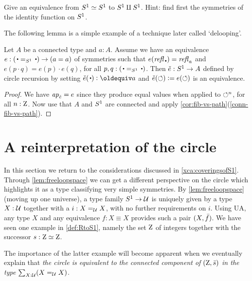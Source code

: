 \begin{xca}\label{xca:S1=S1-eqv-S1+S1}
Give an equivalence from ${S^1}\simeq{S^1}$ to ${S^1}\amalg{S^1}$.
Hint: find first the symmetries of the identity function on ${S^1}$.
\end{xca}

The following lemma is a simple example of a technique later called `delooping'.
\begin{lemma}\label{lem:S1-delooping}
Let $A$ be a connected type and $a:A$. 
Assume we have an equivalence $e:(\base=_{\Sc}\base) \to (a=a)$
of symmetries such that $e(\refl{\base})=\refl{a}$
and $e(p\cdot q)=e(p)\cdot e(q)$, for all $p,q:(\base=_{\Sc}\base)$.
Then $\check e : {S^1}\to A$ defined by circle recursion by setting
$\check e(\base)\defeq a$ and $\check e(\circlearrowleft)\vcentcolon= e(\circlearrowleft)$
is an equivalence.
\end{lemma}
\begin{proof}
We have $\mathop{{\it ap}_{\check e}} = e$ since they produce equal values when applied
to $\circlearrowleft^n$, for all $n:\mathrm{Z}$. Now use that $A$ and ${S^1}$ are connected and
apply \cref{cor:fib-vs-path}(\ref{conn-fib-vs-path}).
\end{proof}

\section{A reinterpretation of the circle}\label{sec:S1isC}

In this section we return to the considerations discussed in \cref{xca:coveringsofS1}.
Through \cref{lem:freeloopspace} we can get a different perspective on the circle which highlights it as a type classifying very simple symmetries.
By \cref{lem:freeloopspace} (moving up one universe), a type family ${S^1}\to\mathcal{U}$ is uniquely given by a type $X:\mathcal{U}$ together with a $i:X=_{\mathcal{U}} X$, with no further requirements on $i$.
Using UA, any type $X$ and any equivalence $f: X\equiv X$ provides such a pair
$(X,\bar {f})$. We have seen one example in \cref{def:RtoS1}, 
namely the set $\mathrm{Z}$ of integers together with the successor $s: \mathrm{Z}\simeq\mathrm{Z}$.

The importance of the latter example will become apparent when we eventually 
explain that \emph{the circle is equivalent to the connected component of 
$(\mathrm{Z},\bar {s})$ in the type $\sum_{X:\mathcal{U}}(X=_{\mathcal{U}}X)$}. 

